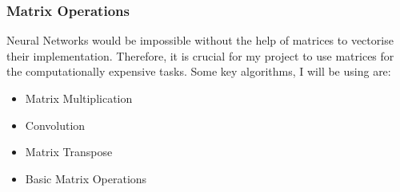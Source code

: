 \subsubsection{Matrix Operations}
Neural Networks would be impossible without the help of matrices to vectorise their implementation. Therefore, it is crucial for my project to use matrices for the computationally expensive tasks. Some key algorithms, I will be using are:
\begin{itemize}
    \item Matrix Multiplication
    \item Convolution
    \item Matrix Transpose
    \item Basic Matrix Operations
\end{itemize}





